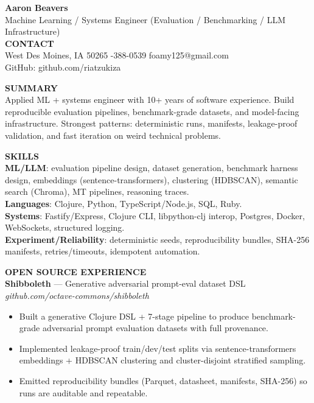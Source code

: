\documentclass[10pt]{article}
\begin{document}
{\LARGE \textbf{Aaron Beavers}}\\
Machine Learning / Systems Engineer (Evaluation / Benchmarking / LLM Infrastructure)\\

\vspace{2pt}
\textbf{CONTACT}\\
West Des Moines, IA 50265 \;\;\textbar\;-388-0539 \;\;\textbar\;\; foamy125@gmail.com\\
GitHub: github.com/riatzukiza

\vspace{4pt}
\textbf{SUMMARY}\\
Applied ML + systems engineer with 10+ years of software experience. Build reproducible evaluation pipelines, benchmark-grade datasets, and model-facing infrastructure. Strongest patterns: deterministic runs, manifests, leakage-proof validation, and fast iteration on weird technical problems.

\vspace{2pt}
\textbf{SKILLS}\\
\textbf{ML/LLM}: evaluation pipeline design, dataset generation, benchmark harness design, embeddings (sentence-transformers), clustering (HDBSCAN), semantic search (Chroma), MT pipelines, reasoning traces.\\
\textbf{Languages}: Clojure, Python, TypeScript/Node.js, SQL, Ruby.\\
\textbf{Systems}: Fastify/Express, Clojure CLI, libpython-clj interop, Postgres, Docker, WebSockets, structured logging.\\
\textbf{Experiment/Reliability}: deterministic seeds, reproducibility bundles, SHA-256 manifests, retries/timeouts, idempotent automation.

\vspace{4pt}
\textbf{OPEN SOURCE EXPERIENCE}\\

\textbf{Shibboleth} --- Generative adversarial prompt-eval dataset DSL \hfill \textit{github.com/octave-commons/shibboleth}\\
\vspace{-6pt}
\begin{itemize}
  \setlength\itemsep{-2pt}
  \setlength\parskip{0pt}
  \setlength\parsep{0pt}
  \item Built a generative Clojure DSL + 7-stage pipeline to produce benchmark-grade adversarial prompt evaluation datasets with full provenance.
  \item Implemented leakage-proof train/dev/test splits via sentence-transformers embeddings + HDBSCAN clustering and cluster-disjoint stratified sampling.
  \item Emitted reproducibility bundles (Parquet, datasheet, manifests, SHA-256) so runs are auditable and repeatable.
\end{itemize}
\end{document}
